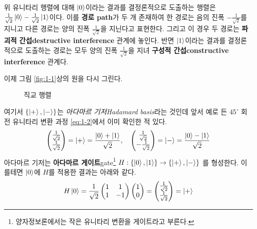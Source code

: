\documentclass[a4paper,chapter,atbegshi]{oblivoir}
\begin{document}
 위 유니타리 행렬에 대해 $\ket{0}$이라는 결과를 결정론적으로 도출하는 행렬은
 $\frac{1}{\sqrt2}\ket0-\frac{1}{\sqrt2}\ket{1}$이다. 이를 \textbf{경로\tiny
 path}가 두 개 존재하여 한 경로는 음의 진폭 $-\frac{1}{\sqrt2}$를 지니고 
 다른 경로는 양의 진폭 $\frac{1}{\sqrt2}$을 지닌다고 표현한다. 그리고 이 경우
 두 경로는 \textbf{파괴적 간섭\tiny destructive interference} 관계에 놓인다. 
 반면 $\ket{1}$이라는 결과를 결정론적으로 도출하는 경로는 모두 양의 진폭
 $\frac{1}{\sqrt2}$을 지녀 \textbf{구성적 간섭\tiny constructive interference}
 관계다.

 이제 그림 \ref{fig:1-1}상의 원을 다시 그린다.
\begin{figure}[h]
\begin{center}
  \caption{직교 행렬\label{fig:1-2}}
\end{center}
\end{figure}
여기서 $\{\ket+,\ket-\}$는 \emph{아다마르 기저\tiny Hadamard basis}라는 것인데
앞서 예로 든 $45^{\circ}$ 회전 유니타리 변환 과정 \ref{eq:1-2}에서 이미
확인한 적 있다. 
\[
  \begin{pmatrix}\frac{1}{\sqrt2}\\\frac{1}{\sqrt2}\end{pmatrix}=\ket+ =
  \frac{\ket0+\ket1}{\sqrt2},\quad\begin{pmatrix}\frac{1}{\sqrt2}\\
  -\frac{1}{\sqrt2}\end{pmatrix} = \ket-=\frac{\ket0-\ket1}{\sqrt2}
\]
아다마르 기저는 \textbf{아다마르 게이트}{\tiny gate}\footnote{양자정보론에서는
작은 유니타리 변환을 게이트라고 부른다.} $H:\{\ket0,\ket1\} \rightarrow
\{\ket+,\ket-\}$ 를 형성한다. 이를테면 $\ket0$에 $H$를 적용한 결과는 아래와 같다.
\[
  H\ket0=\frac{1}{\sqrt2}\begin{pmatrix}1&1\\1&-1\end{pmatrix}
  \begin{pmatrix}1\\0\end{pmatrix} =
  \begin{pmatrix}\frac{1}{\sqrt2}\\\frac{1}{\sqrt2}\end{pmatrix}=\ket+
\]
\end{document}
